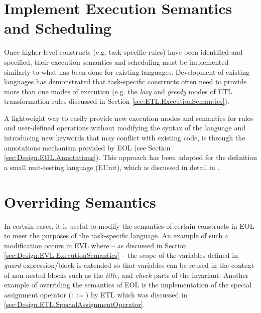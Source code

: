 \section{Implement Execution Semantics and Scheduling}

Once higher-level constructs (e.g. task-specific rules) have been identified and specified, their execution semantics and scheduling must be implemented similarly to what has been done for existing languages. Development of existing languages has demonstrated that task-specific constructs often need to provide more than one modes of execution (e.g. the \emph{lazy} and \emph{greedy} modes of ETL transformation rules discussed in Section \ref{sec:ETL.ExecutionSemantics}). 

A lightweight way to easily provide new execution modes and semantics for rules and user-defined operations without modifying the syntax of the language and introducing new keywords that may conflict with existing code, is through the annotations mechanism provided by EOL (see Section \ref{sec:Design.EOL.Annotations}). This approach has been adopted for the definition a small unit-testing language (EUnit), which is discussed in detail in \cite{EUnit}.

\section{Overriding Semantics}

In certain cases, it is useful to modify the semantics of certain constructs in EOL to meet the purposes of the task-specific language. An example of such a modification occurs in EVL where -- as discussed in Section \ref{sec:Design.EVL.ExecutionSemantics} -- the scope of the variables defined in \emph{guard} expression/block is extended so that variables can be reused in the context of non-nested blocks such as the \emph{title}, and \emph{check} parts of the invariant. Another example of overriding the semantics of EOL is the implementation of the special assignment operator ($::=$) by ETL which was discussed in \ref{sec:Design.ETL.SpecialAssignmentOperator}.




